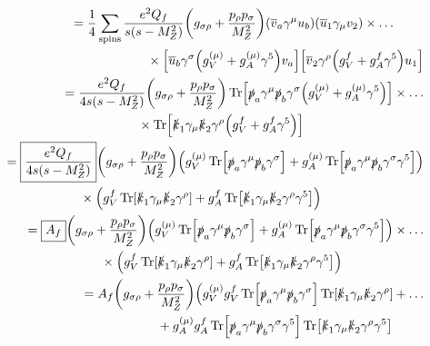 \documentclass[12 pt,draft]{article}
\renewcommand{\b}[1]{\overline{#1}}
\begin{document}
\begin{problem}[ $\mu\b{\mu}\rightarrow f\b{f}$]
\begin{align}
\begin{split}
				&=\oo{4}\sum_\text{spins}
				\frac{e^2Q_f}{s\qty(s-M_Z^2)}
				\qty(g_{\sigma\rho}+\frac{p_\rho p_\sigma}{M_Z^2})
				\qty(\b{v}_a\gamma^\mu u_b)
				\qty(\b{u}_1\gamma_\mu v_2)
				\times\ldots\\&\qquad\qquad\qquad\times
				\qty[\b{u}_b\gamma^\sigma\qty(g_V^{(\mu)}+g_A^{(\mu)}\gamma^5)v_a]
				\qty[\b{v}_2\gamma^\rho\qty(g_V^f+g_A^f\gamma^5)u_1]
			\end{split}
			\\
			\begin{split}
				&=\frac{e^2Q_f}{4s\qty(s-M_Z^2)}
				\qty(g_{\sigma\rho}+\frac{p_\rho p_\sigma}{M_Z^2})
				\Tr[\slsh{p}_a\gamma^\mu \slsh{p}_b\gamma^\sigma\qty(g_V^{(\mu)}+g_A^{(\mu)}\gamma^5)]
				\times\ldots\\&\qquad\qquad\qquad\times
				\Tr[\slsh{k}_1\gamma_\mu \slsh{k}_2\gamma^\rho\qty(g_V^f+g_A^f\gamma^5)]
			\end{split}
			\\
			\begin{split}
				&=\boxed{\frac{e^2Q_f}{4s\qty(s-M_Z^2)}}
				\qty(g_{\sigma\rho}+\frac{p_\rho p_\sigma}{M_Z^2})
				\qty(g_V^{(\mu)}\Tr[\slsh{p}_a\gamma^\mu \slsh{p}_b\gamma^\sigma]+g_A^{(\mu)}\Tr[\slsh{p}_a\gamma^\mu \slsh{p}_b\gamma^\sigma\gamma^5])
				\\&\qquad\qquad\qquad\times
				\qty(g_V^f\Tr[\slsh{k}_1\gamma_\mu \slsh{k}_2\gamma^\rho]+g_A^f\Tr[\slsh{k}_1\gamma_\mu \slsh{k}_2\gamma^\rho\gamma^5])
			\end{split}
			\\
			\begin{split}
				&=\boxed{A_f}
				\qty(g_{\sigma\rho}+\frac{p_\rho p_\sigma}{M_Z^2})
				\qty(g_V^{(\mu)}\Tr[\slsh{p}_a\gamma^\mu \slsh{p}_b\gamma^\sigma]+g_A^{(\mu)}\Tr[\slsh{p}_a\gamma^\mu \slsh{p}_b\gamma^\sigma\gamma^5])
				\times\ldots\\&\qquad\qquad\qquad\times
				\qty(g_V^f\Tr[\slsh{k}_1\gamma_\mu \slsh{k}_2\gamma^\rho]+g_A^f\Tr[\slsh{k}_1\gamma_\mu \slsh{k}_2\gamma^\rho\gamma^5])
			\end{split}
			\\
			\begin{split}
				&=A_f
				\qty(g_{\sigma\rho}+\frac{p_\rho p_\sigma}{M_Z^2})
				\Big(g_V^{(\mu)}g_V^f\Tr[\slsh{p}_a\gamma^\mu \slsh{p}_b\gamma^\sigma]
				\Tr[\slsh{k}_1\gamma_\mu \slsh{k}_2\gamma^\rho]
				+\ldots\\&\qquad\qquad\qquad+
				g_A^{(\mu)}g_A^f\Tr[\slsh{p}_a\gamma^\mu \slsh{p}_b\gamma^\sigma\gamma^5]\Tr[\slsh{k}_1\gamma_\mu \slsh{k}_2\gamma^\rho\gamma^5]

\end{split}
\end{align}
\end{problem}
\end{document}

